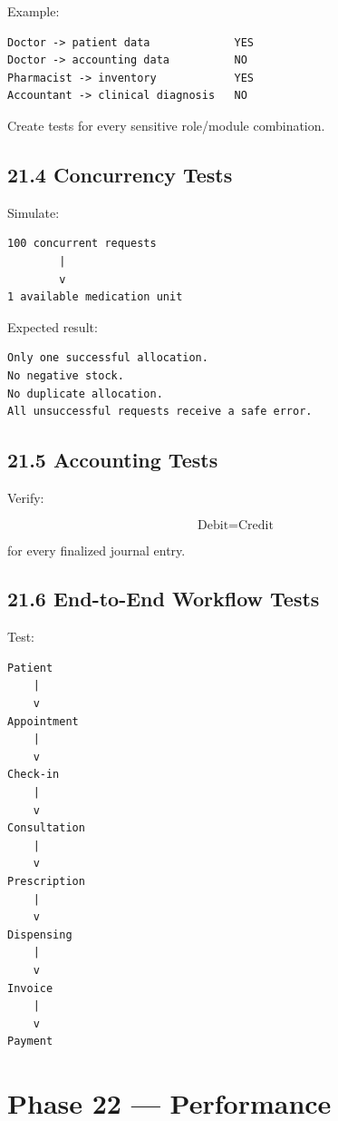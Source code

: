 \documentclass[11pt,a4paper]{article}
\begin{document}
Example:

\begin{lstlisting}
Doctor -> patient data             YES
Doctor -> accounting data          NO
Pharmacist -> inventory            YES
Accountant -> clinical diagnosis   NO
\end{lstlisting}

Create tests for every sensitive role/module combination.

\subsection{21.4 Concurrency Tests}

Simulate:

\begin{lstlisting}
100 concurrent requests
        |
        v
1 available medication unit
\end{lstlisting}

Expected result:

\begin{lstlisting}
Only one successful allocation.
No negative stock.
No duplicate allocation.
All unsuccessful requests receive a safe error.
\end{lstlisting}

\subsection{21.5 Accounting Tests}

Verify:

\[
\text{Debit} = \text{Credit}
\]

for every finalized journal entry.

\subsection{21.6 End-to-End Workflow Tests}

Test:

\begin{lstlisting}
Patient
    |
    v
Appointment
    |
    v
Check-in
    |
    v
Consultation
    |
    v
Prescription
    |
    v
Dispensing
    |
    v
Invoice
    |
    v
Payment
\end{lstlisting}

\section{Phase 22 --- Performance}
\end{document}
